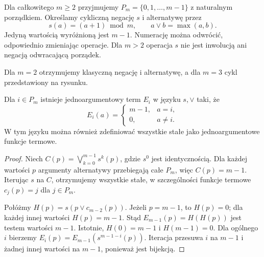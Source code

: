 \begin{definicja}\label{def:ncl-post-chain}
Dla całkowitego $m\geq2$ przyjmujemy
$P_m=\{0,1,\ldots,m-1\}$ z naturalnym porządkiem.
Określamy cykliczną negację $s$ i alternatywę przez
\[
 s(a)=(a+1)\bmod m,\qquad a\vee b=\max(a,b).
\]
Jedyną wartością wyróżnioną jest $m-1$.
Numerację można odwrócić, odpowiednio zmieniając
operacje. Dla $m>2$ operacja $s$ nie jest inwolucją
ani negacją odwracającą porządek.
\end{definicja}
Dla $m=2$ otrzymujemy klasyczną negację i alternatywę,
a dla $m=3$ cykl przedstawiony na rysunku.
\begin{center}
\end{center}

\begin{lemat}\label{lem:ncl-post-tests}
Dla $i\in P_m$ istnieje jednoargumentowy term $E_i$
w języku $s,\vee$ taki, że
\[
 E_i(a)=
 \begin{cases}
 m-1,&a=i,\\
 0,&a\ne i.
 \end{cases}
\]
W tym języku można również zdefiniować wszystkie
stałe jako jednoargumentowe funkcje termowe.
\end{lemat}
\begin{proof}
Niech $C(p)=\bigvee_{k=0}^{m-1}s^k(p)$,
gdzie $s^0$ jest identycznością. Dla każdej wartości
$p$ argumenty alternatywy przebiegają całe $P_m$,
więc $C(p)=m-1$. Iterując $s$ na $C$, otrzymujemy
wszystkie stałe, w szczególności funkcje termowe
$c_j(p)=j$ dla $j\in P_m$.

Połóżmy $H(p)=s(p\vee c_{m-2}(p))$.
Jeżeli $p=m-1$, to $H(p)=0$; dla każdej innej
wartości $H(p)=m-1$. Stąd
$E_{m-1}(p)=H(H(p))$ jest testem wartości $m-1$.
Istotnie, $H(0)=m-1$ i $H(m-1)=0$.
Dla ogólnego $i$ bierzemy
$E_i(p)=E_{m-1}(s^{m-1-i}(p))$.
Iteracja przesuwa $i$ na $m-1$ i żadnej innej
wartości na $m-1$, ponieważ jest bijekcją.
\end{proof}


